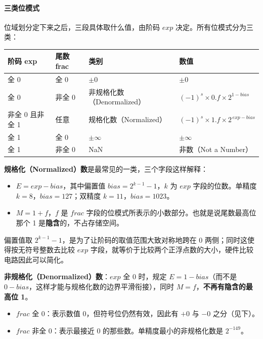 \paragraph{三类位模式}

位域划分定下来之后，三段具体取什么值，由阶码 $exp$ 决定。所有位模式分为三类：

\begin{center}
\small
\begin{tabular}{llll}
\toprule
\textbf{阶码 exp} & \textbf{尾数 frac} & \textbf{类别} & \textbf{数值} \\
\midrule
全 0               & 全 0   & $\pm 0$                & $\pm 0$ \\
全 0               & 非全 0 & 非规格化数（Denormalized） & $(-1)^s \times 0.f \times 2^{1-bias}$ \\
非全 0 且非全 1    & 任意   & 规格化数（Normalized）     & $(-1)^s \times 1.f \times 2^{\,exp-bias}$ \\
全 1               & 全 0   & $\pm\infty$            & $\pm\infty$ \\
全 1               & 非全 0 & NaN                    & 非数（Not a Number） \\
\bottomrule
\end{tabular}
\end{center}

\textbf{规格化（Normalized）数}是最常见的一类，三个字段这样解释：

\begin{itemize}
    \item $E = exp - bias$，其中偏置值 $bias = 2^{k-1} - 1$，$k$ 为 $exp$ 字段的位数。单精度 $k = 8$，$bias = 127$；双精度 $k = 11$，$bias = 1023$。
    \item $M = 1 + f$，$f$ 是 $frac$ 字段的位模式所表示的小数部分。也就是说尾数最高位那个 1 是\textbf{隐含}的，不占存储空间。
\end{itemize}

偏置值取 $2^{k-1} - 1$，是为了让阶码的取值范围大致对称地跨在 0 两侧；同时这使得按无符号整数去比较 $exp$ 字段，就等价于比较两个正浮点数的大小，硬件比较电路因此可以简化。

\textbf{非规格化（Denormalized）数}：$exp$ 全 0 时，规定 $E = 1 - bias$（而不是 $0 - bias$，这样才能与规格化数的边界平滑衔接），同时 $M = f$，\textbf{不再有隐含的最高位 1}。
\begin{itemize}
    \item $frac$ 全 0：表示数值 0，但符号位仍然有效，因此有 $+0$ 与 $-0$ 之分（见下）。
    \item $frac$ 非全 0：表示最接近 0 的那些数。单精度最小的非规格化数是 $2^{-149}$。
\end{itemize}

